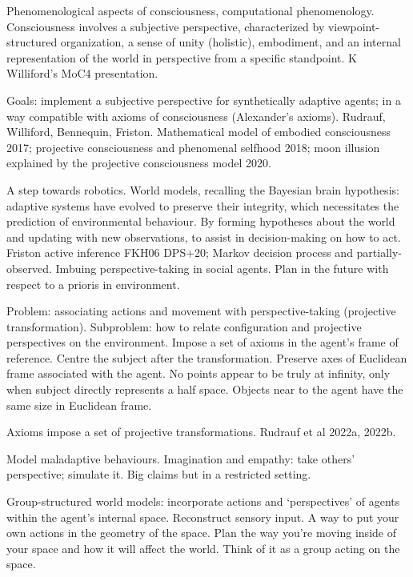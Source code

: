 
\begin{affils}
\end{affils}

Phenomenological aspects of consciousness, computational phenomenology.
Consciousness involves a subjective perspective, characterized by viewpoint-structured
organization, a sense of unity (holistic), embodiment, and an internal representation
of the world in perspective from a specific standpoint.
K Williford's MoC4 presentation.

Goals: implement a subjective perspective for synthetically adaptive agents; in a way
compatible with axioms of consciousness (Alexander's axioms).
Rudrauf, Williford, Bennequin, Friston.
Mathematical model of embodied consciousness 2017; projective consciousness and
phenomenal selfhood 2018; moon illusion explained by the projective consciousness model
2020.

A step towards robotics.
World models, recalling the Bayesian brain hypothesis: adaptive systems have evolved to
preserve their integrity, which necessitates the prediction of environmental behaviour.
By forming hypotheses about the world and updating with new observations, to assist in
decision-making on how to act.
Friston active inference FKH06 DPS+20; Markov decision process and partially-observed.
Imbuing perspective-taking in social agents.
Plan in the future with respect to a prioris in environment.

Problem: associating actions and movement with perspective-taking (projective
transformation).
Subproblem: how to relate configuration and projective perspectives on the environment.
Impose a set of axioms in the agent's frame of reference.
Centre the subject after the transformation.
Preserve axes of Euclidean frame associated with the agent.
No points appear to be truly at infinity, only when subject directly represents a half
space.
Objects near to the agent have the same size in Euclidean frame.

Axioms impose a set of projective transformations.
Rudrauf et al 2022a, 2022b.

Model maladaptive behaviours.
Imagination and empathy: take others' perspective; simulate it.
Big claims but in a restricted setting.

Group-structured world models: incorporate actions and `perspectives' of agents within
the agent's internal space.
Reconstruct sensory input.
A way to put your own actions in the geometry of the space.
Plan the way you're moving inside of your space and how it will affect the world.
Think of it as a group acting on the space.

